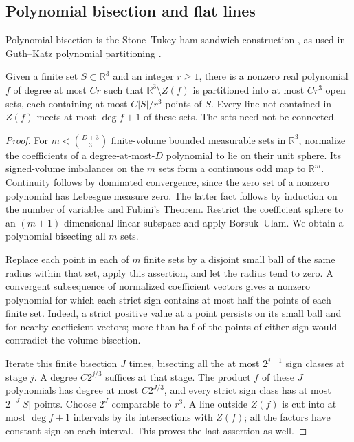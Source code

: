 \subsection{Polynomial bisection and flat lines}

Polynomial bisection is the Stone--Tukey ham-sandwich construction
\cite{stonetukey1942}, as used in Guth--Katz polynomial partitioning
\cite{guthkatz2015}.

\begin{lemma}\label{ci:partition}
Given a finite set $S\subset\mathbb R^3$ and an integer $r\ge1$, there
is a nonzero real polynomial $f$ of degree at most $C r$ such that
$\mathbb R^3\setminus Z(f)$ is partitioned into at most $C r^3$ open
sets, each containing at most $C|S|/r^3$ points of $S$.  Every line not
contained in $Z(f)$ meets at most $\deg f+1$ of these sets.  The sets
need not be connected.
\end{lemma}

\begin{proof}
For $m<\binom{D+3}{3}$ finite-volume bounded measurable sets in
$\mathbb R^3$, normalize the coefficients of a degree-at-most-$D$
polynomial to lie on their unit sphere.  Its signed-volume imbalances
on the $m$ sets form a continuous odd map to $\mathbb R^m$.  Continuity
follows by dominated convergence, since the zero set of a nonzero
polynomial has Lebesgue measure zero.  The latter fact follows by
induction on the number of variables and Fubini's Theorem.  Restrict
the coefficient sphere to an $(m+1)$-dimensional linear subspace and
apply Borsuk--Ulam.  We obtain a polynomial bisecting all $m$ sets.

Replace each point in each of $m$ finite sets by a disjoint small ball
of the same radius within that set, apply this assertion, and let the
radius tend to zero.  A convergent subsequence of normalized coefficient
vectors gives a nonzero polynomial for which each strict sign contains
at most half the points of each finite set.  Indeed, a strict positive
value at a point persists on its small ball and for nearby coefficient
vectors; more than half of the points of either sign would contradict
the volume bisection.

Iterate this finite bisection $J$ times, bisecting all the at most
$2^{j-1}$ sign classes at stage $j$.  A degree $C2^{j/3}$ suffices at
that stage.  The product $f$ of these $J$ polynomials has degree at
most $C2^{J/3}$, and every strict sign class has at most $2^{-J}|S|$
points.  Choose $2^J$ comparable to $r^3$.  A line outside $Z(f)$ is
cut into at most $\deg f+1$ intervals by its intersections with
$Z(f)$; all the factors have constant sign on each interval.  This
proves the last assertion as well.
\end{proof}

